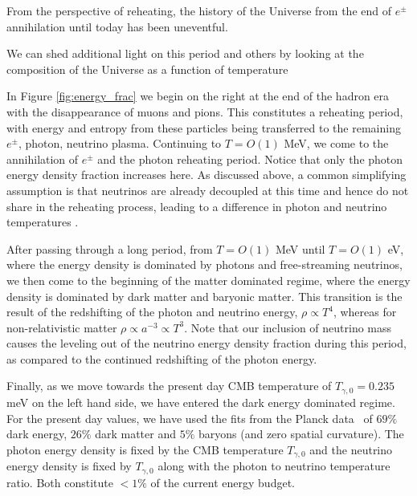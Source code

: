 From the perspective of reheating, the history of the Universe from the end of $e^\pm$ annihilation until today has been uneventful. 

We can shed additional light on this period and others by looking at the composition of the Universe as a function of temperature


In Figure \ref{fig:energy_frac} we begin on the right at the end of the hadron era with the disappearance of muons and pions. This constitutes a reheating period, with energy and entropy from these particles being transferred to the remaining $e^\pm$, photon, neutrino plasma. Continuing to $T=O(1)$ MeV, we come to the annihilation of $e^\pm$ and the photon reheating period. Notice that only the photon energy density fraction increases here. As discussed above, a common simplifying assumption is that neutrinos are already decoupled at this time and hence do not share in the reheating process, leading to a difference in photon and neutrino temperatures .

After passing through a long period, from $T=O(1)$ MeV until $T=O(1)$ eV, where the energy density is dominated by photons and free-streaming neutrinos, we then come to the beginning of the matter dominated regime, where the energy density is dominated by dark matter and baryonic matter. This transition is the result of the redshifting of the photon and neutrino energy, $\rho\propto T^4$, whereas for non-relativistic matter $\rho\propto a^{-3}\propto T^3$. Note that our inclusion of neutrino mass causes the leveling out of the neutrino energy density fraction during this period, as compared to the continued redshifting of the photon energy.

Finally, as we move towards the present day CMB temperature of $T_{\gamma,0}=0.235$ meV on the left hand side, we have entered the dark energy dominated regime. For the present day values, we have used the fits from the Planck data~\cite{Planck:2018vyg,Planck:2015fie,Planck:2013pxb} of $69\%$ dark energy, $26\%$ dark matter and $5\%$ baryons (and zero spatial curvature). The photon energy density is fixed by the CMB temperature $T_{\gamma,0}$ and the neutrino energy density is fixed by $T_{\gamma,0}$ along with the photon to neutrino temperature ratio. Both constitute $<1\%$ of the current energy budget.

